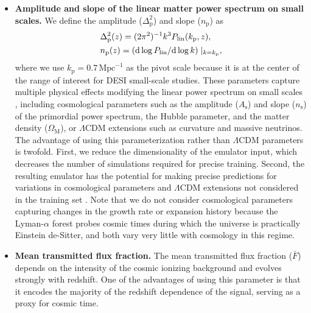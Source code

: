 \documentclass[longauth]{aa}
\newcommand{\lyaf}{Lyman-$\alpha$ forest\xspace}
\newcommand{\mflux}{\ensuremath{\bar{F}}\xspace}
\begin{document}
\begin{itemize}
    \item {\bf Amplitude and slope of the linear matter power spectrum on small scales.} We define the amplitude ($\Delta^2_\mathrm{p}$) and slope ($n_\mathrm{p}$) as
    \begin{align}
        \label{eq:amplitude}
        & \Delta_\mathrm{p}^2(z) = (2\pi^2)^{-1} k^3 P_{\rm lin} (k_\mathrm{p}, z),\\
        \label{eq:slope}
        & n_\mathrm{p}(z) = \left(\mathrm{d}\log P_{\rm lin} / \mathrm{d}\log k\right)\mid_{k = k_\mathrm{p}},
    \end{align}
    where we use $k_\mathrm{p} = 0.7\,\mathrm{Mpc}^{-1}$ as the pivot scale because it is at the center of the range of interest for DESI small-scale studies. These parameters capture multiple physical effects modifying the linear power spectrum on small scales \citep[see][for a detailed discussion]{Pedersen2021}, including cosmological parameters such as the amplitude ($A_\mathrm{s}$) and slope ($n_\mathrm{s}$) of the primordial power spectrum, the Hubble parameter, and the matter density ($\Omega_\mathrm{M}$), or $\Lambda$CDM extensions such as curvature and massive neutrinos. The advantage of using this parameterization rather than $\Lambda$CDM parameters is twofold. First, we reduce the dimensionality of the emulator input, which decreases the number of simulations required for precise training. Second, the resulting emulator has the potential for making precise predictions for variations in cosmological parameters and $\Lambda$CDM extensions not considered in the training set \citep[][]{Pedersen2021, pedersen2023CompressingCosmologicalInformation, cabayol-garcia2023NeuralNetworkEmulator}. Note that we do not consider cosmological parameters capturing changes in the growth rate or expansion history because the \lyaf probes cosmic times during which the universe is practically Einstein de-Sitter, and both vary very little with cosmology in this regime.

    \item {\bf Mean transmitted flux fraction.} The mean transmitted flux fraction (\mflux) depends on the intensity of the cosmic ionizing background and evolves strongly with redshift. One of the advantages of using this parameter is that it encodes the majority of the redshift dependence of the signal, serving as a proxy for cosmic time.


\end{itemize}
\end{document}
